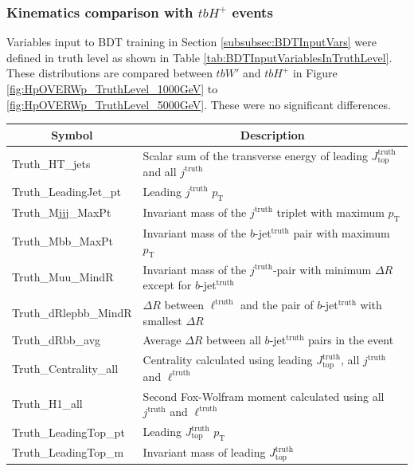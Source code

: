 \subsubsection{Kinematics comparison with $tbH^{+}$ events}
\label{subsubsec:ComparisonWpAndHp}

Variables input to BDT training in Section \ref{subsubsec:BDTInputVars} were defined in truth level as shown in Table \ref{tab:BDTInputVariablesInTruthLevel}. These distributions are compared between $tbW'$ and $tbH^{+}$ in Figure \ref{fig:HpOVERWp_TruthLevel_1000GeV} to \ref{fig:HpOVERWp_TruthLevel_5000GeV}. These were no significant differences.

\begin{table}[H]
  \centering
  \begin{tabular*}{150mm}{@{\extracolsep{\fill}}ll}
    \hline
    \multicolumn{1}{c}{Symbol} & \multicolumn{1}{c}{Description}\\
    \hline\hline
    Truth\_HT\_jets            & Scalar sum of the transverse energy of leading $J_{\text{top}}^{\text{truth}}$ and all $j^{\text{truth}}$\\
    Truth\_LeadingJet\_pt      & Leading $j^{\text{truth}}$ $p_\text{T}$\\
    Truth\_Mjjj\_MaxPt         & Invariant mass of the $j^{\text{truth}}$ triplet with maximum $p_\text{T}$\\
    Truth\_Mbb\_MaxPt          & Invariant mass of the $b$-jet$^{\text{truth}}$ pair with maximum $p_\text{T}$\\
    Truth\_Muu\_MindR          & Invariant mass of the $j^{\text{truth}}$-pair with minimum $\Delta{R}$ except for $b$-jet$^{\text{truth}}$\\
    Truth\_dRlepbb\_MindR      & $\Delta{R}$ between ${\ell}^{\text{truth}}$ and the pair of $b$-jet$^{\text{truth}}$ with smallest $\Delta{R}$\\
    Truth\_dRbb\_avg           & Average $\Delta{R}$ between all $b$-jet$^{\text{truth}}$ pairs in the event\\
    Truth\_Centrality\_all     & Centrality calculated using leading $J_{\text{top}}^{\text{truth}}$, all $j^{\text{truth}}$ and ${\ell}^{\text{truth}}$\\
    Truth\_H1\_all             & Second Fox-Wolfram moment calculated using all $j^{\text{truth}}$ and ${\ell}^{\text{truth}}$\\
    Truth\_LeadingTop\_pt      & Leading $J_{\text{top}}^{\text{truth}}$ $p_\text{T}$\\
    Truth\_LeadingTop\_m       & Invariant mass of leading $J_{\text{top}}^{\text{truth}}$ \\

\end{tabular*}
\end{table}
